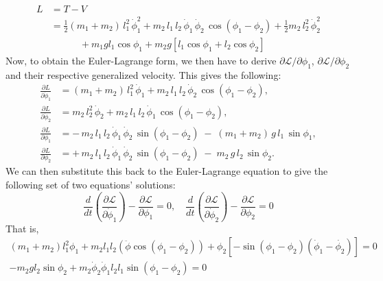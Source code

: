 \begin{equation}
    \begin{split}
            L 
            &= T-V \\
            &= \frac{1}{2}(m_{1} + m_{2})\,l_{1}^{2}\,\dot{\phi}_{1}^{2}
       + m_{2}\,l_{1}\,l_{2}\,\dot{\phi}_{1}\,\dot{\phi}_{2}\,\cos(\phi_{1}-\phi_{2})
       + \frac{1}{2}m_{2}\,l_{2}^{2}\,\dot{\phi}_{2}^{2} \\ 
       & \quad \quad\quad  + m_{1}gl_{1} \cos{\phi_{1}} + m_{2} g[l_{1}\cos{\phi_{1}}+ l_{2}\cos{\phi_{2}}] 
    \end{split}
\end{equation}
Now, to obtain the Euler-Lagrange form, we then have to derive $\partial\mathcal{L}/\partial \phi_{1}$, $\partial\mathcal{L}/\partial \phi_{2}$ and their respective generalized velocity. This gives the following: 
\begin{align}
\frac{\partial L}{\partial \dot\phi_1}
&= (m_1 + m_2)\,l_1^2\,\dot\phi_1
   + m_2\,l_1\,l_2\,\dot\phi_2\,\cos(\phi_1-\phi_2), \\[6pt]
\frac{\partial L}{\partial \dot\phi_2}
&= m_2\,l_2^2\,\dot\phi_2
   + m_2\,l_1\,l_2\,\dot\phi_1\,\cos(\phi_1-\phi_2), \\[6pt]
\frac{\partial L}{\partial \phi_1}
&= -\,m_2\,l_1\,l_2\,\dot\phi_1\,\dot\phi_2\,\sin(\phi_1-\phi_2)
   \;-\;(m_1 + m_2)\,g\,l_1\,\sin\phi_1, \\[6pt]
\frac{\partial L}{\partial \phi_2}
&= +\,m_2\,l_1\,l_2\,\dot\phi_1\,\dot\phi_2\,\sin(\phi_1-\phi_2)
   \;-\;m_2\,g\,l_2\,\sin\phi_2.
\end{align}
We can then substitute this back to the Euler-Lagrange equation to give the following set of two equations' solutions: 
\begin{equation}
    \frac{d}{dt} \left(\frac{\partial \mathcal{L}}{\partial \dot{\phi}_{1}}\right) - \frac{\partial \mathcal{L}}{\partial \phi_{1}} = 0, \quad \frac{d}{dt} \left(\frac{\partial \mathcal{L}}{\partial \dot{\phi}_{2}}\right) - \frac{\partial \mathcal{L}}{\partial \phi_{2}} = 0
\end{equation}
That is, 
\begin{gather}
        (m_{1}+ m_{2})l_{1}^{2}\phi_{1} + m_{2}l_{1}l_{2} (\ddot{\phi}\cos{(\phi_{1}-\phi_{2})}) + \phi_{2}[-\sin{(\phi_{1}-\phi_{2})(\dot{\phi}_{1}-\dot{\phi_{2}})}] = 0 \\
        -m_{2}gl_{2} \sin{\phi_{2}} + m_{2} \dot{\phi}_{2}\dot{\phi}_{1} l_{2}l_{1} \sin{(\phi_{1}-\phi_{2})} = 0
\end{gather}
